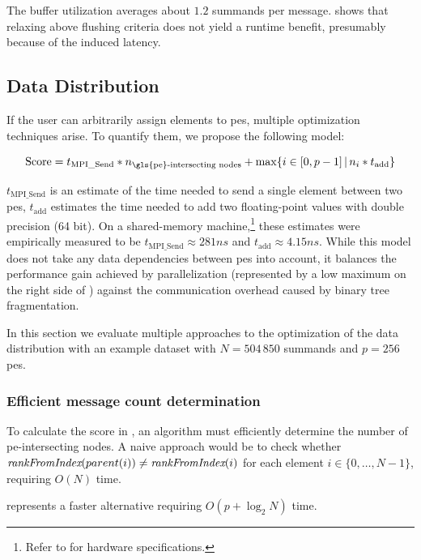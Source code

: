 The buffer utilization averages about $1.2$ summands per message.
 shows that relaxing above flushing criteria does not yield a runtime benefit, presumably because of the induced latency.

\subsection{Data Distribution}
\label{sec:DataDistribution}

If the user can arbitrarily assign elements to \glspl{pe}, multiple optimization techniques arise. To quantify them, we propose the following model:

\begin{equation}
\label{eq:distributionScore}
\textrm{Score} = t_{\textrm{MPI\_Send}} * n_{\textrm{\gls{pe}-intersecting nodes}} + \max \{ i \in [0, p - 1]\, |\, n_i * t_{\textrm{add}} \}
\end{equation}

$t_{\textrm{MPI\_Send}}$ is an estimate of the time needed to send a single element between two \glspl{pe}, $t_\textrm{add}$ estimates the time needed to add two floating-point values with double precision (64 bit).
On a shared-memory machine,\footnote{Refer to  for hardware specifications.} these estimates were empirically measured to be $t_{\textrm{MPI\_Send}} \approx 281ns$ and $t_\textrm{add} \approx 4.15ns$.
While this model does not take any data dependencies between \glspl{pe} into account, it balances the performance gain achieved by parallelization (represented by a low maximum on the right side of ) against the communication overhead caused by binary tree fragmentation. 

In this section we evaluate multiple approaches to the optimization of the data distribution with an example dataset with $N = 504\,850$ summands and $p = 256$ \glspl{pe}.

\subsubsection{Efficient message count determination}
To calculate the score in , an algorithm must efficiently determine the number of \gls{pe}-intersecting nodes.
A naive approach would be to check whether $\textit{rankFromIndex}(parent(i)) \neq \textit{rankFromIndex}(i)$ for each element $i \in \{0, \ldots, N-1\}$, requiring $O(N)$ time.

 represents a faster alternative requiring $O(p + \log_2 N)$ time.

